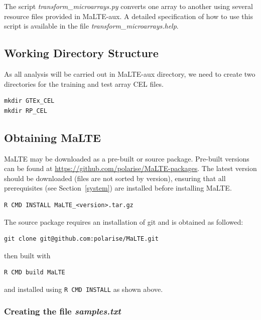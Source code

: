 \documentclass[a4paper,12pt]{article}
\begin{document}
The script \textit{transform\_microarrays.py} converts one array to another using several resource files provided in \textsf{MaLTE-aux}. A detailed specification of how to use this script is available in the file \textit{transform\_microarrays.help}.

\subsection{Working Directory Structure}
\label{usecase:directory}

As all analysis will be carried out in \textsf{MaLTE-aux} directory, we need to create two directories for the training and test array CEL files. 

\begin{verbatim}
mkdir GTEx_CEL
mkdir RP_CEL
\end{verbatim}

\subsection{Obtaining MaLTE}
\label{usecase:malte}

\textsf{MaLTE} may be downloaded as a pre-built or source package. Pre-built versions can be found at \url{https://github.com/polarise/MaLTE-packages}. The latest version should be downloaded (files are not sorted by version), ensuring that all prerequisites (see Section~\ref{system}) are installed before installing \textsf{MaLTE}.

\begin{verbatim}
R CMD INSTALL MaLTE_<version>.tar.gz
\end{verbatim} 

The source package requires an installation of \textsf{git} and is obtained as followed:
\begin{verbatim}
git clone git@github.com:polarise/MaLTE.git
\end{verbatim} 

then built with
\begin{verbatim}
R CMD build MaLTE
\end{verbatim}

and installed using \texttt{R CMD INSTALL} as shown above. 

\subsubsection{Creating the file \textit{samples.txt}}
\label{usecase:samples.txt}
\end{document}
